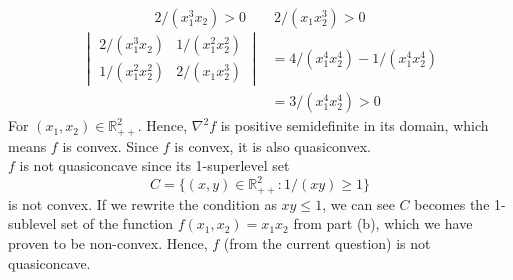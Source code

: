 \documentclass{article}
\begin{document}
\begin{itemize}
\begin{itemize}
    \[ 2/(x_1^3x_2) > 0 \qquad 2/(x_1x_2^3) > 0 \]
    \begin{align*}
      \begin{vmatrix} 2/(x_1^3x_2) & 1/(x_1^2x_2^2) \\ 1/(x_1^2x_2^2) & 2/(x_1x_2^3) \end{vmatrix}
      &= 4/(x_1^4x_2^4) - 1/(x_1^4x_2^4) \\
      &= 3/(x_1^4x_2^4) > 0
    \end{align*}
    For $(x_1, x_2) \in \mathbb{R}_{++}^2$. Hence, $\nabla^2 f$ is positive semidefinite in its domain, which means $f$ is convex. Since $f$ is convex, it is also quasiconvex. \\
    $f$ is not quasiconcave since its 1-superlevel set
    \[ C = \{(x, y) \in \mathbb{R}_{++}^2 : 1/(xy) \ge 1\} \]
    is not convex. If we rewrite the condition as $xy \le 1$, we can see $C$ becomes the 1-sublevel set of the function $f(x_1, x_2) = x_1x_2$ from part (b), which we have proven to be non-convex.
    Hence, $f$ (from the current question) is not quasiconcave.
  \end{itemize}
  

\end{itemize}
\end{document}
